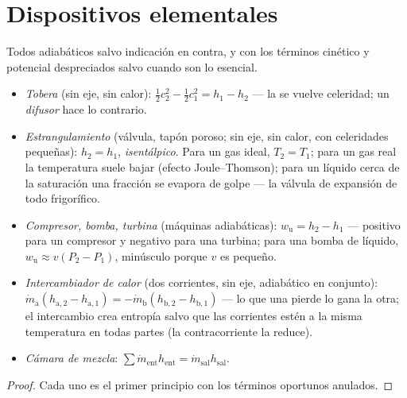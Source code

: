 \section{Dispositivos elementales}

\begin{proposition}\label{prop:b2:open-systems:devices}
Todos adiabáticos salvo indicación en contra,  y con los términos cinético y potencial
despreciados salvo cuando son lo esencial.
\begin{itemize}
\item \emph{Tobera} (sin eje, sin calor): $\tfrac12c_2^2 -
      \tfrac12c_1^2 = h_1 - h_2$ --- la  se vuelve celeridad; un
      \emph{difusor} hace lo contrario.
\item \emph{Estrangulamiento} (válvula, tapón poroso; sin eje,
      sin calor, con celeridades pequeñas): $h_2 = h_1$, \emph{isentálpico}. Para un
      gas ideal, $T_2 = T_1$; para un gas real la temperatura suele
      bajar (efecto Joule--Thomson); para un líquido cerca de la saturación una
      fracción se evapora de golpe --- la válvula de expansión de todo
      frigorífico.
\item \emph{Compresor, bomba, turbina} (máquinas
      adiabáticas): $w_{\text{u}} = h_2 - h_1$ --- positivo para un compresor y
      negativo para una turbina; para una bomba de líquido, $w_{\text{u}} \approx
      v(P_2 - P_1)$, minúsculo porque $v$ es pequeño.
\item \emph{Intercambiador de calor} (dos corrientes, sin
      eje, adiabático en conjunto): $\dot m_{\text{a}}(h_{\text{a},2} -
      h_{\text{a},1}) = -\dot m_{\text{b}}(h_{\text{b},2} - h_{\text{b},1})$
      --- lo que una pierde lo gana la otra; el intercambio crea entropía
      salvo que las corrientes estén a la misma temperatura en todas partes
      (la contracorriente la reduce).
\item \emph{Cámara de mezcla}: $\sum\dot m_{\text{ent}}h_{\text{ent}} = \dot
      m_{\text{sal}}h_{\text{sal}}$.
\end{itemize}
\end{proposition}

\begin{proof}
Cada uno es el primer principio con los términos oportunos anulados.
\end{proof}

